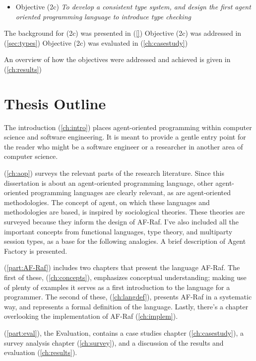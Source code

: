 \documentclass[a4paper,12pt,oneside,fleqn]{book} %
\newcommand{\rg}[1]{\marginpar{\tiny\raggedright\textcolor{blue}{\bf rg:} #1}}
\renewcommand{\rg}{}
\begin{document}
\begin{itemize}
\item Objective (2c) \textit{To develop a consistent type system,
    and design the first agent oriented programming language to introduce
  type checking}
\end{itemize}

The background for (2c) was presented in (\autoref{})
Objective (2c) was addressed in (\autoref{sec:types})
Objective (2c) was  evaluated in (\autoref{ch:casestudy})

An overview of how the objectives were addressed and achieved is given in
(\autoref{ch:results})


\section{Thesis Outline} %
The introduction (\autoref{ch:intro}) places agent-oriented programming
within computer science and software engineering. It is meant to provide a
gentle entry point for the reader who might be a software engineer or a
researcher in another area of computer science.

(\autoref{ch:aop}) surveys the relevant parts of the research literature. Since this dissertation is about an agent-oriented
programming language, other agent-oriented programming languages are
clearly relevant, as are agent-oriented methodologies. The concept of
agent, on which these languages and methodologies are based, is inspired by
sociological theories. These theories are surveyed because they inform the
design of AF-Raf. I've also included all the important concepts from
functional languages, type theory, and  multiparty session types, as a base
for the following analogies. A brief description of Agent Factory is presented.

(\autoref{part:AF-Raf}) includes two chapters that present the language
AF-Raf. The first of these, (\autoref{ch:concepts}), emphasizes conceptual
understanding; making use of
plenty of examples it serves as a first introduction to the language
for a programmer. The second of these, (\autoref{ch:langdef}), presents
AF-Raf in a systematic way, and represents a formal
definition of the language. Lastly, there's a chapter overlooking the
implementation of AF-Raf (\autoref{ch:implem}).

(\autoref{part:eval}), the Evaluation, contains a case studies chapter
(\autoref{ch:casestudy}), a survey analysis chapter
(\autoref{ch:survey}), and a discussion of the results and evaluation
(\autoref{ch:results}).
\end{document}
